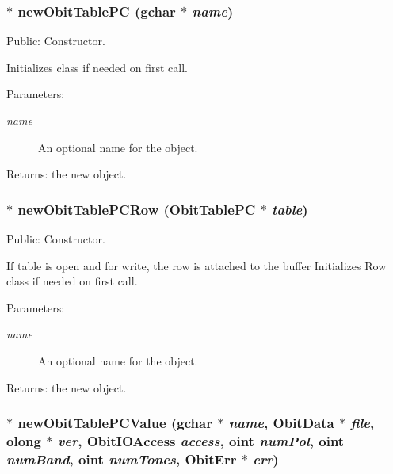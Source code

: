\subsubsection{$\ast$ new\-Obit\-Table\-PC (gchar $\ast$ {\em name})}\label{ObitTablePC_8c_a16}


Public: Constructor. 

Initializes class if needed on first call. \begin{Desc}
\item[Parameters:]
\begin{description}
\item[{\em name}]An optional name for the object. \end{description}
\end{Desc}
\begin{Desc}
\item[Returns:]the new object. \end{Desc}
\subsubsection{$\ast$ new\-Obit\-Table\-PCRow ({\bf Obit\-Table\-PC} $\ast$ {\em table})}\label{ObitTablePC_8c_a14}


Public: Constructor. 

If table is open and for write, the row is attached to the buffer Initializes Row class if needed on first call. \begin{Desc}
\item[Parameters:]
\begin{description}
\item[{\em name}]An optional name for the object. \end{description}
\end{Desc}
\begin{Desc}
\item[Returns:]the new object. \end{Desc}
\subsubsection{$\ast$ new\-Obit\-Table\-PCValue (gchar $\ast$ {\em name}, {\bf Obit\-Data} $\ast$ {\em file}, {\bf olong} $\ast$ {\em ver}, Obit\-IOAccess {\em access}, {\bf oint} {\em num\-Pol}, {\bf oint} {\em num\-Band}, {\bf oint} {\em num\-Tones}, {\bf Obit\-Err} $\ast$ {\em err})}\label{ObitTablePC_8c_a18}


